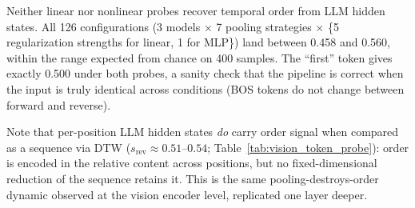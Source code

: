 \documentclass{article}
\theoremstyle{remark}
\begin{document}
\begin{table}[h]
\centering
\caption{Probe accuracy (GroupKFold CV, fwd/rev pairs kept together) for forward vs.\ reverse classification from LLM hidden states. Linear = logistic regression (best across $C \in \{0.01, 0.1, 1, 10, 100\}$); MLP = 2-layer, 256 hidden units, ReLU. Chance = 0.500. No configuration exceeds chance.}
\label{tab:linear_probe}
\end{table}

Neither linear nor nonlinear probes recover temporal order from LLM hidden states. All 126 configurations (3 models $\times$ 7 pooling strategies $\times$ \{5 regularization strengths for linear, 1 for MLP\}) land between 0.458 and 0.560, within the range expected from chance on 400 samples. The ``first'' token gives exactly 0.500 under both probes, a sanity check that the pipeline is correct when the input is truly identical across conditions (BOS tokens do not change between forward and reverse).

Note that per-position LLM hidden states \emph{do} carry order signal when compared as a sequence via DTW ($s_\text{rev} \approx 0.51$--$0.54$; Table~\ref{tab:vision_token_probe}): order is encoded in the relative content across positions, but no fixed-dimensional reduction of the sequence retains it. This is the same pooling-destroys-order dynamic observed at the vision encoder level, replicated one layer deeper.
\end{document}
